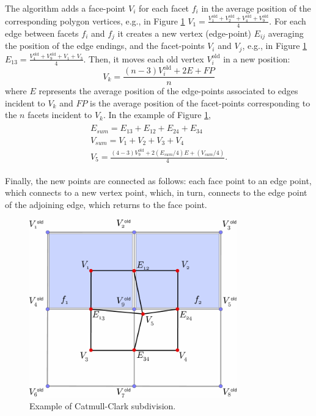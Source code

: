 The algorithm adds a face-point $V_i$ for each facet $f_i$ in the average position of the corresponding polygon vertices, e.g., in Figure \ref{fig:subdivisionCatmull} $V_1 = \frac{V_1^{\text{old}} + V_2^{\text{old}} + V_4^{\text{old}} + V_9^{\text{old}}}{4}$. 
For each edge between facets $f_{i}$ and $f_{j}$ it creates a new vertex (edge-point) $E_{ij}$ averaging the position of the edge endings, and the facet-points $V_{i}$ and $V_{j}$, e.g., in Figure \ref{fig:subdivisionCatmull} $E_{13} = \frac{V_4^{\text{old}} + V_9^{\text{old}} + V_1 + V_3}{4}$.
Then, it moves each old vertex $V_i^{\text{old}}$ in a new position:
\[
V_k = \frac{(n-3)V_i^{\text{old}} + 2E + FP}{n}
\]
where $E$ represents the average position of the edge-points associated to edges incident to $V_k$ and  $FP$ is the average position of the facet-points corresponding to the $n$ facets incident to $V_k$. In the example of Figure \ref{fig:subdivisionCatmull}, 
\begin{align}
\begin{split}
    E_{sum} = E_{13}+E_{12}+E_{24}+E_{34}\\
    V_{sum} = V_1+V_2+V_3+V_4\\
    V_5 = \frac{(4-3)V_9^{\text{old}} + 2(E_{sum}/4)E + (V_{sum}/4)}{4}.
\end{split}
\end{align}




Finally, the new points are connected as follows: each face point to an edge point, which connects to a new vertex point, which, in turn, connects to the edge point of the adjoining edge, which returns to the face point.


\begin{figure}
\begin{center}
\centering
  \includegraphics[width=0.8\textwidth]{./img/subdivisionCatmull}
 \caption{Example of Catmull-Clark subdivision.}
 \label{fig:subdivisionCatmull}
\end{center}
\end{figure}

